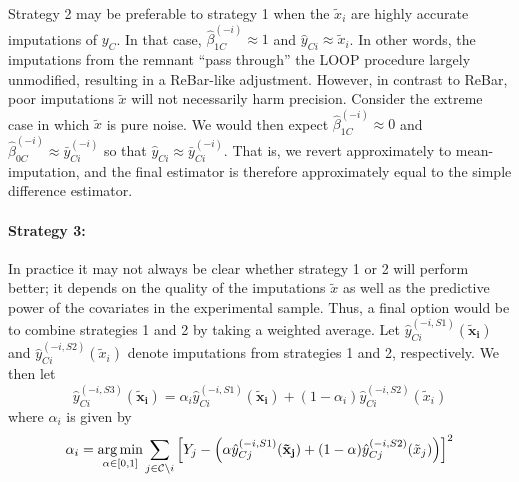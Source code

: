 Strategy 2 may be preferable to strategy 1 when the $\tilde{x}_{i}$ are highly accurate imputations of $y_C$.  In that case, $\hat{\beta}_{1C}^{(-i)} \approx 1$ 
and $\hat{y}_{Ci} \approx \tilde{x}_{i}$.  In other words, the imputations from the remnant ``pass through'' the LOOP procedure largely unmodified, resulting in a ReBar-like adjustment.  However, in contrast to ReBar, poor imputations $\tilde{x}$ will not necessarily harm precision.  Consider the extreme case in which $\tilde{x}$ is pure noise.  We would then expect $\hat{\beta}_{1C}^{(-i)} \approx 0$ and $\hat{\beta}_{0C}^{(-i)} \approx \bar{y}^{(-i)}_{Ci}$ so that $\hat{y}_{Ci} \approx \bar{y}^{(-i)}_{Ci}$.  That is, we revert approximately to mean-imputation, and the final estimator is therefore approximately equal to the simple difference estimator.  

\paragraph{Strategy 3:}  

In practice it may not always be clear whether strategy 1 or 2 will perform better; it depends on the quality of the imputations $\tilde{x}$ as well as the predictive power of the covariates in the experimental sample.  Thus, a final option would be to combine strategies 1 and 2 by taking a weighted average.  Let $\hat{y}^{(-i, S1)}_{Ci}(\mathbf{\tilde{x}_i})$ and $\hat{y}^{(-i, S2)}_{Ci}(\tilde{x}_i)$ denote imputations from strategies 1 and 2, respectively.  We then let  
\begin{equation}
\hat{y}^{(-i, S3)}_{Ci}(\mathbf{\tilde{x}_i}) = \alpha_i \hat{y}^{(-i, S1)}_{Ci}(\mathbf{\tilde{x}_i}) + (1-\alpha_i) \hat{y}^{(-i, S2)}_{Ci}(\tilde{x}_i)
\end{equation}
where $\alpha_i$ is given by
\begin{equation}
\alpha_i = \operatorname*{arg\,min}_{\alpha \in [0,1]} \sum_{j \in \mathcal{C} \setminus i} \left[Y_j - \left(\alpha \hat{y}^{(-i, S1)}_{Cj}(\mathbf{\tilde{x}_j}) + (1-\alpha) \hat{y}^{(-i, S2)}_{Cj}(\tilde{x}_j) \right)\right]^2
\end{equation}







